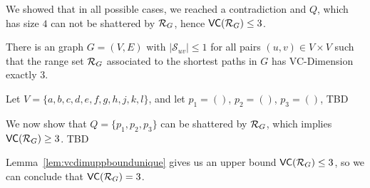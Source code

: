 \begin{IEEEproof}
  We showed that in all possible cases, we reached a contradiction and $Q$,
  which has size $4$ can not be shattered by $\mathcal{R}_G$, hence $\mathsf{VC}(\mathcal{R}_G)\le
  3$.
\end{IEEEproof}

\begin{lemma}\label{lem:vcdimlowboundunique}
  There is an graph $G=(V,E)$ with $|\mathcal{S}_{uv}|\le1$ for all
  pairs $(u,v)\in V\times V$ such that the range set $\mathcal{R}_G$ associated to the
  shortest paths in $G$ has VC-Dimension exactly $3$.
\end{lemma}

\begin{IEEEproof}
  Let $V=\{a,b,c,d,e,f,g,h,j,k,l\}$, and let $p_1=()$, $p_2=()$, $p_3=()$, \XXX
  TBD

  We now show that $Q=\{p_1,p_2,p_3\}$ can be shattered by $\mathcal{R}_G$, which
  implies $\mathsf{VC}(\mathcal{R}_G)\ge 3$. \XXX TBD

  Lemma~\ref{lem:vcdimuppboundunique} gives us an upper bound $\mathsf{VC}(\mathcal{R}_G)\le3$,
  so we can conclude that $\mathsf{VC}(\mathcal{R}_G)=3$.
\end{IEEEproof}

